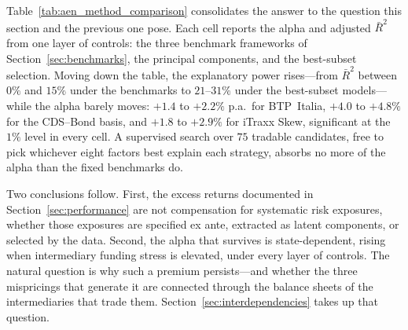 Table~\ref{tab:aen_method_comparison} consolidates the answer to the
question this section and the previous one pose. Each cell reports the
alpha and adjusted $\bar{R}^2$ from one layer of controls: the three
benchmark frameworks of Section~\ref{sec:benchmarks}, the principal
components, and the best-subset selection. Moving down the table, the
explanatory power rises---from $\bar{R}^2$ between $0\%$ and $15\%$
under the benchmarks to $21$--$31\%$ under the best-subset
models---while the alpha barely moves: $+1.4$ to $+2.2\%$ p.a.\ for
BTP~Italia, $+4.0$ to $+4.8\%$ for the CDS--Bond basis, and $+1.8$ to
$+2.9\%$ for iTraxx Skew, significant at the $1\%$ level in every
cell. A supervised search over $75$ tradable candidates, free to pick
whichever eight factors best explain each strategy, absorbs no more of
the alpha than the fixed benchmarks do.

Two conclusions follow. First, the excess returns documented in
Section~\ref{sec:performance} are not compensation for systematic risk
exposures, whether those exposures are specified ex ante, extracted as
latent components, or selected by the data. Second, the alpha that
survives is state-dependent, rising when intermediary funding stress
is elevated, under every layer of controls. The natural question is
why such a premium persists---and whether the three mispricings that
generate it are connected through the balance sheets of the
intermediaries that trade them. Section~\ref{sec:interdependencies}
takes up that question.
